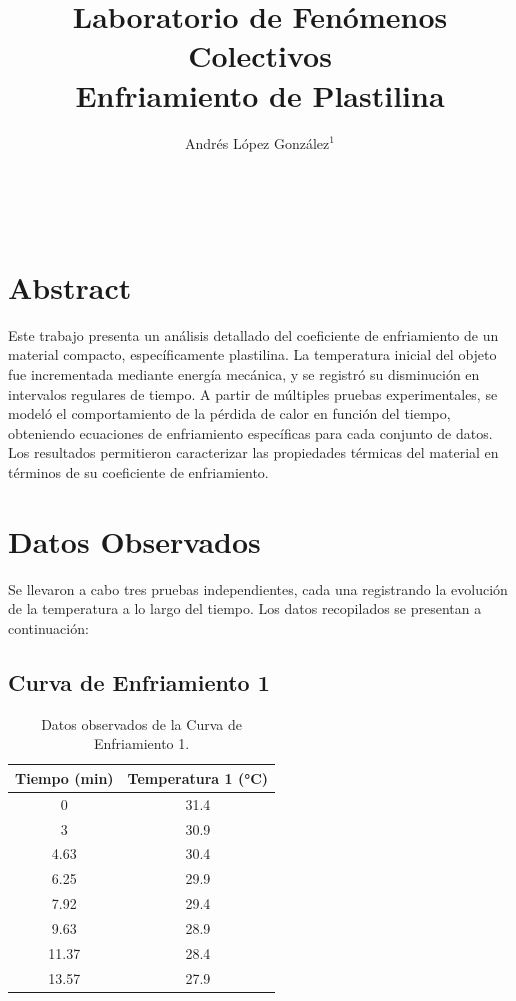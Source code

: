 \documentclass[article,12pt]{elsarticle}
\begin{document}
\begin{frontmatter}
    \title{Laboratorio de Fenómenos Colectivos \\ Enfriamiento de Plastilina} \\
    \author{Andrés López González$^1$} %
    \address{$^1$ Facultad de Ciencias, Universidad Nacional Autónoma de México, M\'exico CDMX.}
\end{frontmatter}

\section*{Abstract}

Este trabajo presenta un análisis detallado del coeficiente de enfriamiento de un material compacto, específicamente plastilina. La temperatura inicial del objeto fue incrementada mediante energía mecánica, y se registró su disminución en intervalos regulares de tiempo. A partir de múltiples pruebas experimentales, se modeló el comportamiento de la pérdida de calor en función del tiempo, obteniendo ecuaciones de enfriamiento específicas para cada conjunto de datos. Los resultados permitieron caracterizar las propiedades térmicas del material en términos de su coeficiente de enfriamiento.

\section*{Datos Observados}

Se llevaron a cabo tres pruebas independientes, cada una registrando la evolución de la temperatura a lo largo del tiempo. Los datos recopilados se presentan a continuación:

\subsection*{Curva de Enfriamiento 1}
\begin{table}[H]
\centering
\begin{tabular}{|c|c|}
\hline
\textbf{Tiempo (min)} & \textbf{Temperatura 1 (°C)} \\ \hline
0                     & 31.4                       \\ \hline
3                     & 30.9                       \\ \hline
4.63                  & 30.4                       \\ \hline
6.25                  & 29.9                       \\ \hline
7.92                  & 29.4                       \\ \hline
9.63                  & 28.9                       \\ \hline
11.37                 & 28.4                       \\ \hline
13.57                 & 27.9                       \\ \hline
\end{tabular}
\caption{Datos observados de la Curva de Enfriamiento 1.}
\end{table}
\end{document}
